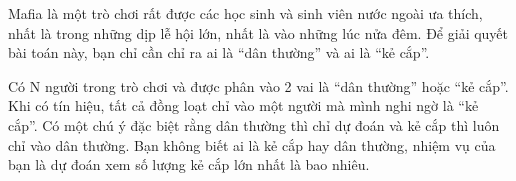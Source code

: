 Mafia là một trò chơi rất được các học sinh và sinh viên nước ngoài ưa thích, nhất là trong những dịp lễ hội lớn, nhất là vào những lúc nửa đêm. Để giải quyết bài toán này, bạn chỉ cần chỉ ra ai là “dân thường” và ai là “kẻ cắp”.  

   Có N người trong trò chơi và được phân vào 2 vai là “dân thường” hoặc “kẻ cắp”. Khi có tín hiệu, tất cả đồng loạt chỉ vào một người mà mình nghi ngờ là “kẻ cắp”. Có một chú ý đặc biệt rằng dân thường thì chỉ dự đoán và kẻ cắp thì luôn chỉ vào dân thường. Bạn không biết ai là kẻ cắp hay dân thường, nhiệm vụ của bạn là dự đoán xem số lượng kẻ cắp lớn nhất là bao nhiêu.